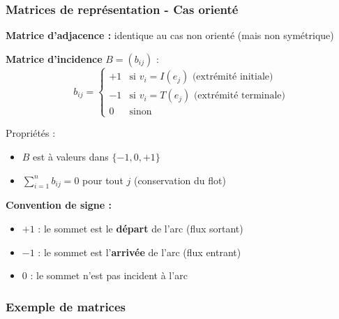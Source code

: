 \documentclass[12pt,a4paper]{article}
\begin{document}
\subsubsection{Matrices de représentation - Cas orienté}

\begin{definition}
\textbf{Matrice d'adjacence :} identique au cas non orienté (mais non symétrique)

\textbf{Matrice d'incidence} $B = (b_{ij})$ :
$$b_{ij} = \begin{cases}
    +1 & \text{si } v_i = I(e_j) \text{ (extrémité initiale)}\\
    -1 & \text{si } v_i = T(e_j) \text{ (extrémité terminale)}\\
    0 & \text{sinon}
\end{cases}$$

Propriétés :
\begin{itemize}
    \item $B$ est à valeurs dans $\{-1, 0, +1\}$
    \item $\sum_{i=1}^{n} b_{ij} = 0$ pour tout $j$ (conservation du flot)
\end{itemize}
\end{definition}

\begin{notecours}
\textbf{Convention de signe :}
\begin{itemize}
    \item $+1$ : le sommet est le \textbf{départ} de l'arc (flux sortant)
    \item $-1$ : le sommet est l'\textbf{arrivée} de l'arc (flux entrant)
    \item $0$ : le sommet n'est pas incident à l'arc
\end{itemize}
\end{notecours}

\newpage
\subsubsection{Exemple de matrices}
\end{document}
